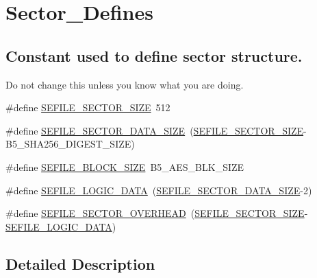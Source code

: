 \hypertarget{group___sector___defines}{\section{Sector\-\_\-\-Defines}
\label{group___sector___defines}
}
\subsection*{Constant used to define sector structure.}
\label{_amgrp878a4016ba8d9172160307f2a4efbb65}%
Do not change this unless you know what you are doing. \begin{DoxyCompactItemize}
\item 
\#define \hyperlink{group___sector___defines_gad205a758c315675de3ad9f5f1cbf962d}{S\-E\-F\-I\-L\-E\-\_\-\-S\-E\-C\-T\-O\-R\-\_\-\-S\-I\-Z\-E}~512
\item 
\#define \hyperlink{group___sector___defines_ga6961ed45e472749b587136d18eb74b4d}{S\-E\-F\-I\-L\-E\-\_\-\-S\-E\-C\-T\-O\-R\-\_\-\-D\-A\-T\-A\-\_\-\-S\-I\-Z\-E}~(\hyperlink{group___sector___defines_gad205a758c315675de3ad9f5f1cbf962d}{S\-E\-F\-I\-L\-E\-\_\-\-S\-E\-C\-T\-O\-R\-\_\-\-S\-I\-Z\-E}-\/B5\-\_\-\-S\-H\-A256\-\_\-\-D\-I\-G\-E\-S\-T\-\_\-\-S\-I\-Z\-E)
\item 
\#define \hyperlink{group___sector___defines_ga9344350dc20df5bbdc5693775c54afcb}{S\-E\-F\-I\-L\-E\-\_\-\-B\-L\-O\-C\-K\-\_\-\-S\-I\-Z\-E}~B5\-\_\-\-A\-E\-S\-\_\-\-B\-L\-K\-\_\-\-S\-I\-Z\-E
\item 
\#define \hyperlink{group___sector___defines_ga460525481b728a7bbad706019c7f2156}{S\-E\-F\-I\-L\-E\-\_\-\-L\-O\-G\-I\-C\-\_\-\-D\-A\-T\-A}~(\hyperlink{group___sector___defines_ga6961ed45e472749b587136d18eb74b4d}{S\-E\-F\-I\-L\-E\-\_\-\-S\-E\-C\-T\-O\-R\-\_\-\-D\-A\-T\-A\-\_\-\-S\-I\-Z\-E}-\/2)
\item 
\#define \hyperlink{group___sector___defines_ga70a387176632325441aebca4839e19fc}{S\-E\-F\-I\-L\-E\-\_\-\-S\-E\-C\-T\-O\-R\-\_\-\-O\-V\-E\-R\-H\-E\-A\-D}~(\hyperlink{group___sector___defines_gad205a758c315675de3ad9f5f1cbf962d}{S\-E\-F\-I\-L\-E\-\_\-\-S\-E\-C\-T\-O\-R\-\_\-\-S\-I\-Z\-E}-\/\hyperlink{group___sector___defines_ga460525481b728a7bbad706019c7f2156}{S\-E\-F\-I\-L\-E\-\_\-\-L\-O\-G\-I\-C\-\_\-\-D\-A\-T\-A})
\end{DoxyCompactItemize}


\subsection{Detailed Description}


